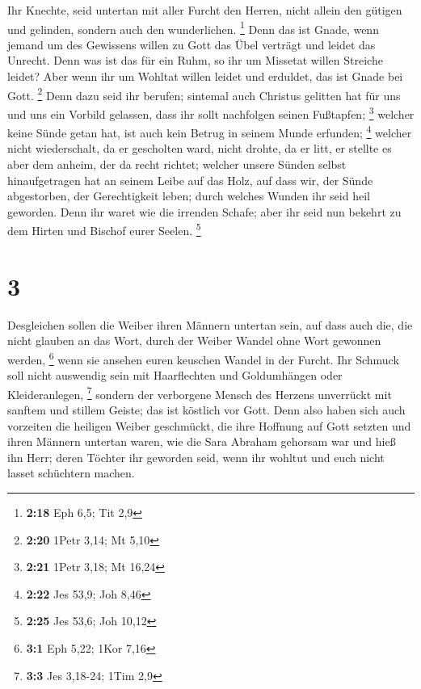  Ihr Knechte, seid untertan mit aller Furcht den Herren,
nicht allein den gütigen und gelinden, sondern auch den wunderlichen.
\footnote{\textbf{2:18} Eph 6,5; Tit 2,9}  Denn das ist
Gnade, wenn jemand um des Gewissens willen zu Gott das Übel verträgt und
leidet das Unrecht.  Denn was ist das für ein Ruhm, so
ihr um Missetat willen Streiche leidet? Aber wenn ihr um Wohltat willen
leidet und erduldet, das ist Gnade bei Gott. \footnote{\textbf{2:20}
  1Petr 3,14; Mt 5,10}  Denn dazu seid ihr berufen;
sintemal auch Christus gelitten hat für uns und uns ein Vorbild
gelassen, dass ihr sollt nachfolgen seinen Fußtapfen; \footnote{\textbf{2:21}
  1Petr 3,18; Mt 16,24}  welcher keine Sünde getan hat,
ist auch kein Betrug in seinem Munde erfunden; \footnote{\textbf{2:22}
  Jes 53,9; Joh 8,46}  welcher nicht wiederschalt, da er
gescholten ward, nicht drohte, da er litt, er stellte es aber dem
anheim, der da recht richtet;  welcher unsere Sünden
selbst hinaufgetragen hat an seinem Leibe auf das Holz, auf dass wir,
der Sünde abgestorben, der Gerechtigkeit leben; durch welches Wunden ihr
seid heil geworden.  Denn ihr waret wie die irrenden
Schafe; aber ihr seid nun bekehrt zu dem Hirten und Bischof eurer
Seelen. \footnote{\textbf{2:25} Jes 53,6; Joh 10,12}

\hypertarget{section-1}{%
\section{3}\label{section-1}}

 Desgleichen sollen die Weiber ihren Männern untertan
sein, auf dass auch die, die nicht glauben an das Wort, durch der Weiber
Wandel ohne Wort gewonnen werden, \footnote{\textbf{3:1} Eph 5,22; 1Kor
  7,16}  wenn sie ansehen euren keuschen Wandel in der
Furcht.  Ihr Schmuck soll nicht auswendig sein mit
Haarflechten und Goldumhängen oder Kleideranlegen, \footnote{\textbf{3:3}
  Jes 3,18-24; 1Tim 2,9}  sondern der verborgene Mensch
des Herzens unverrückt mit sanftem und stillem Geiste; das ist köstlich
vor Gott.  Denn also haben sich auch vorzeiten die
heiligen Weiber geschmückt, die ihre Hoffnung auf Gott setzten und ihren
Männern untertan waren,  wie die Sara Abraham gehorsam war
und hieß ihn Herr; deren Töchter ihr geworden seid, wenn ihr wohltut und
euch nicht lasset schüchtern machen.

